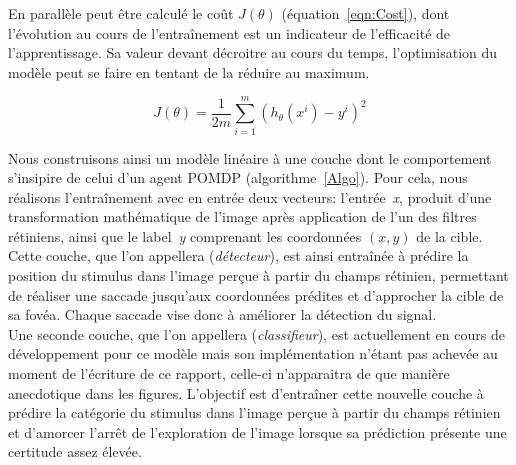 En parallèle peut être calculé le coût $J(\theta)$ (équation~\ref{eqn:Cost}), dont l'évolution au cours de l'entraînement est un indicateur de l'efficacité de l'apprentissage. Sa valeur devant décroitre au cours du temps, l'optimisation du modèle peut se faire en tentant de la réduire au maximum.

\begin{equation}
J(\theta) = \frac{1}{2m} \sum_{i=1}^m (h_\theta(x^i)-y^i)^2
\label{eqn:Cost}
\end{equation}

Nous construisons ainsi un modèle linéaire à une couche dont le comportement s'insipire de celui d'un agent POMDP (algorithme~\ref{Algo}). Pour cela, nous réalisons l'entraînement avec en entrée deux vecteurs: l'entrée~\textit{x}, produit d'une transformation mathématique de l'image après application de l'un des filtres rétiniens, ainsi que le label~\textit{y} comprenant les coordonnées $(x,y)$ de la cible.\\
Cette couche, que l'on appellera (\textit{détecteur}), est ainsi entraînée à prédire la position du stimulus dans l'image perçue à partir du champs rétinien, permettant de réaliser une saccade jusqu'aux coordonnées prédites et d'approcher la cible de sa fovéa. Chaque saccade vise donc à améliorer la détection du signal.\autocite{Friston2012}\\
Une seconde couche, que l'on appellera (\textit{classifieur}), est actuellement en cours de développement pour ce modèle mais son implémentation n'étant pas achevée au moment de l'écriture de ce rapport, celle-ci n'apparaitra de que manière anecdotique dans les figures. L'objectif est d'entraîner cette nouvelle couche à prédire la catégorie du stimulus dans l'image perçue à partir du champs rétinien et d'amorcer l'arrêt de l'exploration de l'image lorsque sa prédiction présente une certitude assez élevée.